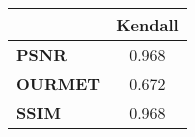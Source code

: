 \begin{tabular}{|l|c|}
\hline
&\textbf{Kendall}\\\hline
\textbf{PSNR}&0.968\\\hline
\textbf{OURMET}&0.672\\\hline
\textbf{SSIM}&0.968\\\hline
\end{tabular}
